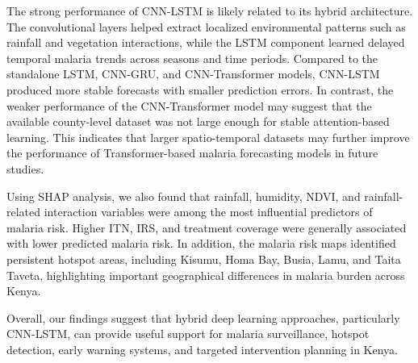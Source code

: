 The strong performance of CNN-LSTM is likely related to its hybrid architecture. The convolutional layers helped extract localized environmental patterns such as rainfall and vegetation interactions, while the LSTM component learned delayed temporal malaria trends across seasons and time periods. Compared to the standalone LSTM, CNN-GRU, and CNN-Transformer models, CNN-LSTM produced more stable forecasts with smaller prediction errors. In contrast, the weaker performance of the CNN-Transformer model may suggest that the available county-level dataset was not large enough for stable attention-based learning. This indicates that larger spatio-temporal datasets may further improve the performance of Transformer-based malaria forecasting models in future studies.

 Using SHAP analysis, we also found that rainfall, humidity, NDVI, and rainfall-related interaction variables were among the most influential predictors of malaria risk. Higher ITN, IRS, and treatment coverage were generally associated with lower predicted malaria risk. In addition, the malaria risk maps identified persistent hotspot areas, including Kisumu, Homa Bay, Busia, Lamu, and Taita Taveta, highlighting important geographical differences in malaria burden across Kenya.

Overall, our findings suggest that hybrid deep learning approaches, particularly CNN-LSTM, can provide useful support for malaria surveillance, hotspot detection, early warning systems, and targeted intervention planning in Kenya.
